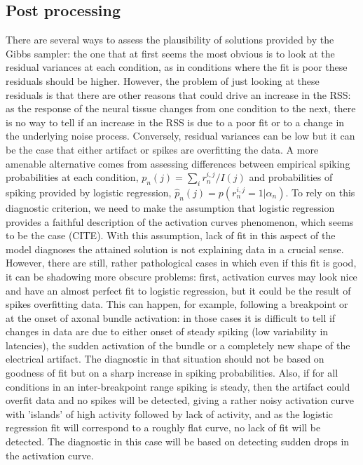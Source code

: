 \documentclass[12pt,letterpaper,fleqn]{article}
\begin{document}
\subsection{Post processing}
There are several ways to assess the plausibility of solutions provided by the Gibbs sampler: the one that at first seems the most obvious is to look at the residual variances at each condition, as in conditions where the fit is poor these residuals should be higher. However, the problem of just looking at these residuals is that there are other reasons that could drive an increase in the RSS: as the response of the neural tissue changes from one condition to the next, there is no way to tell if an increase in the RSS is due to a poor fit or to a change in the underlying noise process. Conversely, residual variances can be low but it can be the case that either artifact or spikes are overfitting the data. A more amenable alternative comes from assessing differences between empirical spiking probabilities at each condition, $p_n(j)=\sum_i r_n^{i,j}/I(j)$ and probabilities of spiking provided by logistic regression, $\hat{p}_n(j)=p(r_n^{i,j}=1|\alpha_n)$. To rely on this diagnostic criterion, we need to make the assumption that logistic regression provides a faithful description of the activation curves phenomenon, which seems to be the case (CITE). With this assumption, lack of fit in this aspect of the model diagnoses the attained solution is not explaining data in a crucial sense. 
However, there are still, rather pathological cases in which even if this fit is good, it can be shadowing more obscure problems: first, activation curves may look nice and have an almost perfect fit to logistic regression, but it could be the result of spikes overfitting data. This can happen, for example, following a breakpoint or at the onset of axonal bundle activation: in those cases it is difficult to tell if changes in data are due to either onset of steady spiking (low variability in latencies), the sudden activation of the bundle or a completely new shape of the electrical artifact. The diagnostic in that situation should not be based on goodness of fit but on a sharp increase in spiking probabilities. Also, if for all conditions in an inter-breakpoint range spiking is steady, then the artifact could overfit data and no spikes will be detected, giving a rather noisy activation curve with 'islands' of high activity followed by lack of activity, and as the logistic regression fit will correspond to a roughly flat curve, no lack of fit will be detected. The diagnostic in this case will be based on detecting sudden drops in the activation curve.\\
\end{document}

